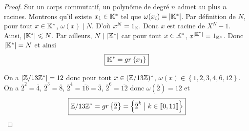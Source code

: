 \documentclass[12pt]{article}
\begin{document}
\begin{proof}
	Sur un corps commutatif, un polynôme de degré $n$ admet au plus $n$ racines. Montrons qu'il existe $x_{1}\in\mathbb{K}^{*}$ tel que $\omega(x_{i})=\vert\mathbb{K}^{*}\vert$. Par définition de $N$, pour tout $x\in\mathbb{K}^{*}$, $\omega(x)\mid N$. D'où $x^{N}=1_{\mathbb{K}}$. Donc $x$ est racine de $X^{N}-1$. Ainsi, $\vert\mathbb{K}^{*}\vert\leqslant N$. Par ailleurs, $N\mid\vert\mathbb{K}^{*}\vert$ car pour tout $x\in\mathbb{K}^{*}$, $x^{\vert\mathbb{K}^{*}\vert}=1_{\mathbb{K}^{*}}$. Donc $\vert\mathbb{K}^{*}\vert=N$ et ainsi 
	\begin{equation}
		\boxed{\mathbb{K}^{*}=gr\left\{x_{1}\right\}}
	\end{equation}

	On a $\vert\mathbb{Z}/13\mathbb{Z}^{*}\vert=12$ donc pour tout $\overline{x}\in(\mathbb{Z}/13\mathbb{Z})^{*}$, $\omega(\overline{x})\in\left\{1,2,3,4,6,12\right\}$. On a $\overline{2}^{2}=\overline{4}$, $\overline{2}^{3}=\overline{8}$, $\overline{2}^{4}=\overline{16}=\overline{3}$, $\overline{2}^{6}=\overline{12}$ donc $\omega(\overline{2})=12$ et 
	\begin{equation}
		\boxed{
		\mathbb{Z}/13\mathbb{Z}^{*}=gr\left\{\overline{2}\right\}=\left\{\overline{2}^{k}\bigm| k\in\left\llbracket 0,11\right\rrbracket\right\}}
	\end{equation}
\end{proof}
\end{document}
